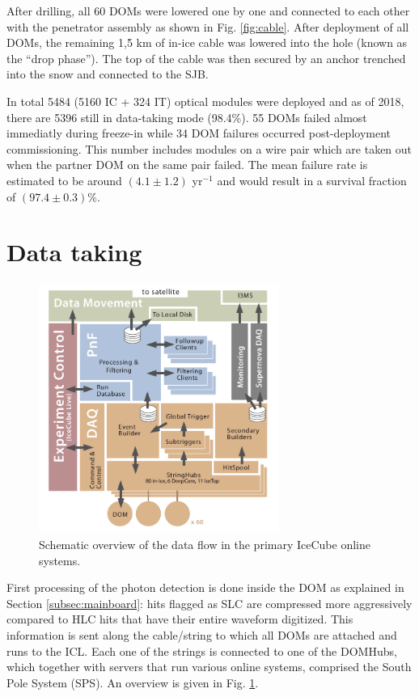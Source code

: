 After drilling, all 60 DOMs were lowered one by one and connected to each other with the penetrator assembly as shown in Fig. \ref{fig:cable}. After deployment of all DOMs, the remaining 1,\.5 km of in-ice cable was lowered into the hole (known as the ``drop phase''). The top of the cable was then secured by an anchor trenched into the snow and connected to the SJB. 

In total 5484 (5160 IC + 324 IT) optical modules were deployed and as of 2018, there are 5396 still in data-taking mode (98.4\%). 55 DOMs failed almost immediatly during freeze-in while 34 DOM failures occurred post-deployment commissioning. This number includes modules on a wire pair which are taken out when the partner DOM on the same pair failed. The mean failure rate is estimated to be around $(4.1 \pm 1.2)$ yr$^{-1}$ and would result in a survival fraction of $(97.4 \pm 0.3)\%$.

\section{Data taking}
\label{sec:datataking}

\begin{figure}[ht]
\centering
\includegraphics[width=0.7\textwidth]{chapter5/img/dataflow.png}
\caption{Schematic overview of the data flow in the primary IceCube online systems.}
\label{fig:dataflow}
\end{figure}
First processing of the photon detection is done inside the DOM as explained in Section \ref{subsec:mainboard}: hits flagged as SLC are compressed more aggressively compared to HLC hits that have their entire waveform digitized. This information is sent along the cable/string to which all DOMs are attached and runs to the ICL. Each one of the strings is connected to one of the DOMHubs, which together with servers that run various online systems, comprised the South Pole System (SPS). An overview is given in Fig. \ref{fig:dataflow}.

